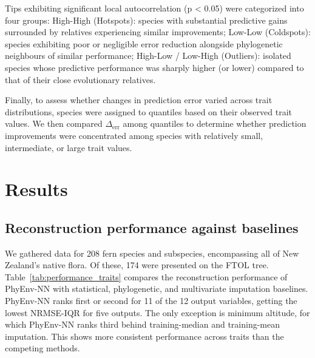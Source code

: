 \documentclass[preprint,12pt,authoryear]{elsarticle}
\newcommand{\awesomeModel}{PhyEnv-NN }
\begin{document}
Tips exhibiting significant local autocorrelation (p < 0.05) were categorized into four groups: High-High (Hotspots): species with substantial predictive gains surrounded by relatives experiencing similar improvements; Low-Low (Coldspots): species exhibiting poor or negligible error reduction alongside phylogenetic neighbours of similar performance; High-Low / Low-High (Outliers): isolated species whose predictive performance was sharply higher (or lower) compared to that of their close evolutionary relatives.

Finally, to assess whether changes in prediction error varied across trait distributions, species were assigned to quantiles based on their observed trait values. We then compared $\Delta_\mathrm{err}$ among quantiles to determine whether prediction improvements were concentrated among species with relatively small, intermediate, or large trait values.

\section{Results}
\subsection{Reconstruction performance against baselines}

We gathered data for 208 fern species and subspecies, encompassing all of New Zealand's native flora. Of these, 174 were presented on the FTOL tree. Table~\ref{tab:performance_traits} compares the reconstruction performance of \awesomeModel with statistical, phylogenetic, and multivariate imputation baselines. \awesomeModel ranks first or second for 11 of the 12 output variables, getting the lowest NRMSE-IQR for five outputs. The only exception is minimum altitude, for which \awesomeModel ranks third behind training-median and training-mean imputation. This shows more consistent performance across traits than the competing methods.
\end{document}
